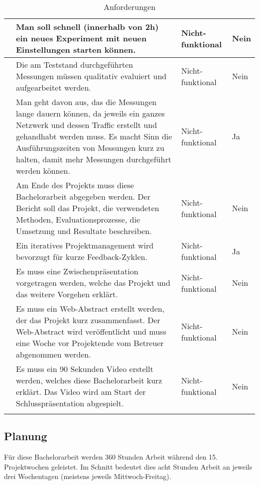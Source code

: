 \begin{longtable}{N p{8.5cm} l l}
      & Man soll schnell (innerhalb von 2h) ein neues Experiment mit neuen Einstellungen starten können. & Nicht-funktional & Nein \\ \midrule
      & Die am Teststand durchgeführten Messungen müssen qualitativ evaluiert und aufgearbeitet werden.  & Nicht-funktional & Nein \\ \midrule
      & Man geht davon aus, das die Messungen lange dauern können, da jeweils ein ganzes Netzwerk und dessen Traffic erstellt und gehandhabt werden muss. Es macht Sinn die Ausführungszeiten von Messungen kurz zu halten, damit mehr Messungen durchgeführt werden können. & Nicht-funktional & Ja \\ \midrule
      & Am Ende des Projekts muss diese Bachelorarbeit abgegeben werden. Der Bericht soll das Projekt, die verwendeten Methoden, Evaluationsprozesse, die Umsetzung und Resultate beschreiben.
                & Nicht-funktional & Nein \\ \midrule
      & Ein iteratives Projektmanagement wird bevorzugt für kurze Feedback-Zyklen. & Nicht-funktional & Ja \\ \midrule
      & Es muss eine Zwischenpräsentation vorgetragen werden, welche das Projekt und das weitere Vorgehen erklärt.
                & Nicht-funktional & Nein \\ \midrule
      & Es muss ein Web-Abstract erstellt werden, der das Projekt kurz zusammenfasst. Der Web-Abstract wird veröffentlicht und muss eine Woche vor Projektende vom Betreuer abgenommen werden.
                & Nicht-funktional & Nein \\ \midrule
      & Es muss ein 90 Sekunden Video erstellt werden, welches diese Bachelorarbeit kurz erklärt. Das Video wird am Start der Schlusspräsentation abgespielt.
                & Nicht-funktional & Nein \\ \midrule
    \bottomrule
    \caption{Anforderungen}\label{tab:anforderungen}
\end{longtable}

\subsection{Planung}
\label{sec:Planung}

Für diese Bachelorarbeit werden 360 Stunden Arbeit während den 15. Projektwochen geleistet.
Im Schnitt bedeutet dies acht Stunden Arbeit an jeweils drei Wochentagen (meistens jeweils Mittwoch-Freitag).

